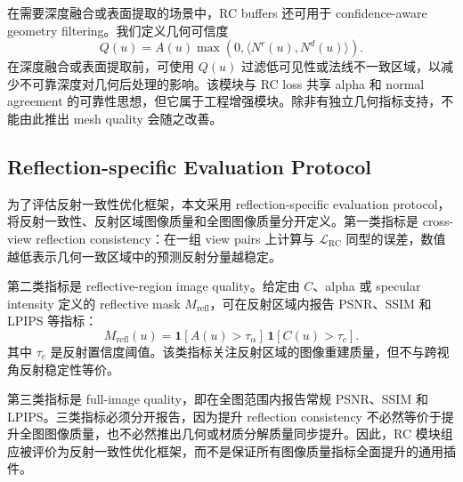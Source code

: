 \documentclass[UTF8,a4paper,11pt]{ctexart}
\newcommand{\Ind}[1]{\mathbf{1}\!\left[#1\right]}
\begin{document}
在需要深度融合或表面提取的场景中，RC buffers 还可用于 confidence-aware geometry filtering。我们定义几何可信度
\begin{equation}
Q(u)=A(u)\max(0,\langle N^r(u),N^d(u)\rangle).
\end{equation}
在深度融合或表面提取前，可使用 \(Q(u)\) 过滤低可见性或法线不一致区域，以减少不可靠深度对几何后处理的影响。该模块与 RC loss 共享 alpha 和 normal agreement 的可靠性思想，但它属于工程增强模块。除非有独立几何指标支持，不能由此推出 mesh quality 会随之改善。

\subsection{Reflection-specific Evaluation Protocol}

为了评估反射一致性优化框架，本文采用 reflection-specific evaluation protocol，将反射一致性、反射区域图像质量和全图图像质量分开定义。第一类指标是 cross-view reflection consistency：在一组 view pairs 上计算与 \(\mathcal{L}_{\mathrm{RC}}\) 同型的误差，数值越低表示几何一致区域中的预测反射分量越稳定。

第二类指标是 reflective-region image quality。给定由 \(C\)、alpha 或 specular intensity 定义的 reflective mask \(M_{\mathrm{refl}}\)，可在反射区域内报告 PSNR、SSIM 和 LPIPS 等指标：
\begin{equation}
M_{\mathrm{refl}}(u)=
\Ind{A(u)>\tau_\alpha}\,
\Ind{C(u)>\tau_c}.
\end{equation}
其中 \(\tau_c\) 是反射置信度阈值。该类指标关注反射区域的图像重建质量，但不与跨视角反射稳定性等价。

第三类指标是 full-image quality，即在全图范围内报告常规 PSNR、SSIM 和 LPIPS。三类指标必须分开报告，因为提升 reflection consistency 不必然等价于提升全图图像质量，也不必然推出几何或材质分解质量同步提升。因此，RC 模块组应被评价为反射一致性优化框架，而不是保证所有图像质量指标全面提升的通用插件。
\end{document}
